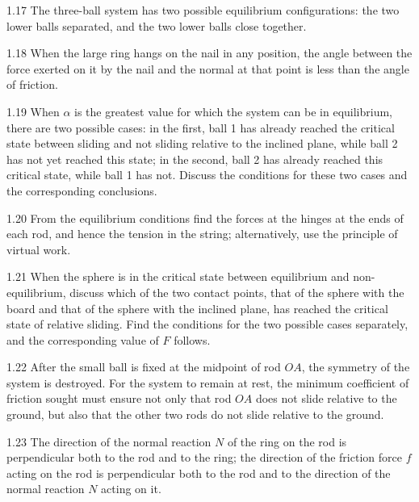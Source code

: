 \begin{hint}{1.17}
The three-ball system has two possible equilibrium configurations: the two lower balls separated, and the two lower balls close together.
\end{hint}

\begin{hint}{1.18}
When the large ring hangs on the nail in any position, the angle between the force exerted on it by the nail and the normal at that point is less than the angle of friction.
\end{hint}

\begin{hint}{1.19}
When $\alpha$ is the greatest value for which the system can be in equilibrium, there are two possible cases: in the first, ball 1 has already reached the critical state between sliding and not sliding relative to the inclined plane, while ball 2 has not yet reached this state; in the second, ball 2 has already reached this critical state, while ball 1 has not. Discuss the conditions for these two cases and the corresponding conclusions.
\end{hint}

\begin{hint}{1.20}
From the equilibrium conditions find the forces at the hinges at the ends of each rod, and hence the tension in the string; alternatively, use the principle of virtual work.
\end{hint}

\begin{hint}{1.21}
When the sphere is in the critical state between equilibrium and non-equilibrium, discuss which of the two contact points, that of the sphere with the board and that of the sphere with the inclined plane, has reached the critical state of relative sliding. Find the conditions for the two possible cases separately, and the corresponding value of $F$ follows.
\end{hint}

\begin{hint}{1.22}
After the small ball is fixed at the midpoint of rod $OA$, the symmetry of the system is destroyed. For the system to remain at rest, the minimum coefficient of friction sought must ensure not only that rod $OA$ does not slide relative to the ground, but also that the other two rods do not slide relative to the ground.
\end{hint}

\begin{hint}{1.23}
The direction of the normal reaction $N$ of the ring on the rod is perpendicular both to the rod and to the ring; the direction of the friction force $f$ acting on the rod is perpendicular both to the rod and to the direction of the normal reaction $N$ acting on it.
\end{hint}

